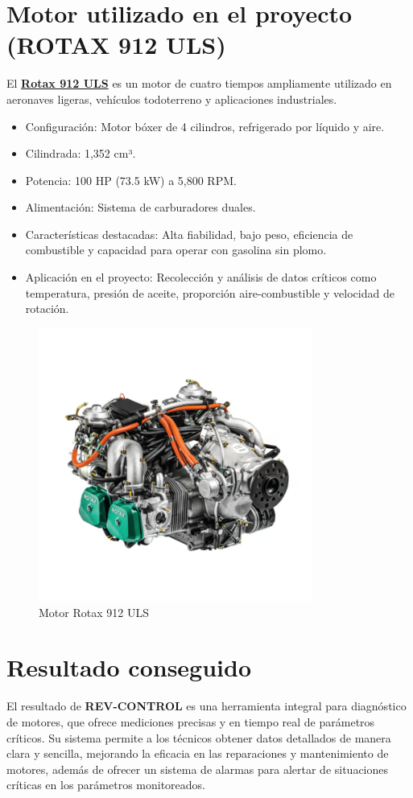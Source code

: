 \section{Motor utilizado en el proyecto (ROTAX 912 ULS)}

El \textbf{\href{https://www.flyrotax.com/products/912-uls-s}{Rotax 912 ULS}} es un motor de cuatro tiempos ampliamente utilizado en aeronaves ligeras, vehículos todoterreno y aplicaciones industriales.  
\begin{itemize}
    \item Configuración: Motor bóxer de 4 cilindros, refrigerado por líquido y aire.  
    \item Cilindrada: 1,352 cm³.  
    \item Potencia: 100 HP (73.5 kW) a 5,800 RPM.  
    \item Alimentación: Sistema de carburadores duales.  
    \item Características destacadas: Alta fiabilidad, bajo peso, eficiencia de combustible y capacidad para operar con gasolina sin plomo.  
    \item Aplicación en el proyecto: Recolección y análisis de datos críticos como temperatura, presión de aceite, proporción aire-combustible y velocidad de rotación.  
\end{itemize}

\begin{figure}[H]
    \centering
    \includegraphics[width=0.8\textwidth]{Imagenes/ROTAX.png}
    \caption{Motor Rotax 912 ULS}
    \label{fig:motor_rotax_912}
\end{figure}


\section{Resultado conseguido}  
El resultado de \textbf{REV-CONTROL} es una herramienta integral para diagnóstico de motores, que ofrece mediciones precisas y en tiempo real de parámetros críticos. Su sistema permite a los técnicos obtener datos detallados de manera clara y sencilla, mejorando la eficacia en las reparaciones y mantenimiento de motores, además de ofrecer un sistema de alarmas para alertar de situaciones críticas en los parámetros monitoreados.
